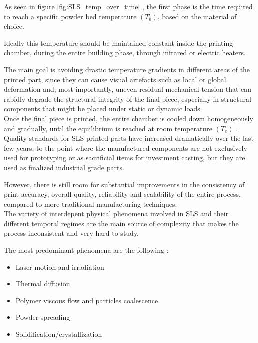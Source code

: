 \documentclass{article}
\begin{document}
    As seen in figure \ref{fig:SLS_temp_over_time} \autocites{Inkscape}, the first phase is the time required to reach a specific powder bed temperature $(T_b)$, based on the material of choice. 

    Ideally this temperature should be maintained constant inside the printing
    chamber, during the entire building phase, through infrared or electric heaters. 
    
    The main goal is avoiding drastic temperature gradients in different areas of the printed part, since they can cause 
    visual artefacts such as local or global deformation and, most importantly, uneven residual mechanical tension that can 
    rapidly degrade the structural integrity of the final piece, especially in structural components that might be placed under static or
    dynamic loads. \\ 
    
    Once the final piece is printed, the entire chamber is cooled down homogeneously and gradually, until the equilibrium is reached at room 
    temperature $(T_e)$ \autocite*{Padovano_SLS_Review}. \\ 

    Quality standards for SLS printed parts have increased dramatically over the last few years, to the point where 
    the manufactured components are not exclusively used for prototyping or as sacrificial items for investment casting, but they are 
    used as finalized industrial grade parts. 

    However, there is still room for substantial improvements in the consistency of print accuracy, overall quality, reliability 
    and scalability of the entire process, compared to more traditional manufacturing techniques. \\ 

    The variety of interdepent physical phenomena involved in SLS and their different temporal regimes are the main 
    source of complexity that makes the process inconsistent and very hard to study. 

    The most predominant phenomena are the following \autocite*{Padovano_SLS_Review}: 

    \begin{itemize}
        \item Laser motion and irradiation
        \item Thermal diffusion
        \item Polymer viscous flow and particles coalescence 
        \item Powder spreading
        \item Solidification/crystallization 
    \end{itemize} 
    
\end{document}
